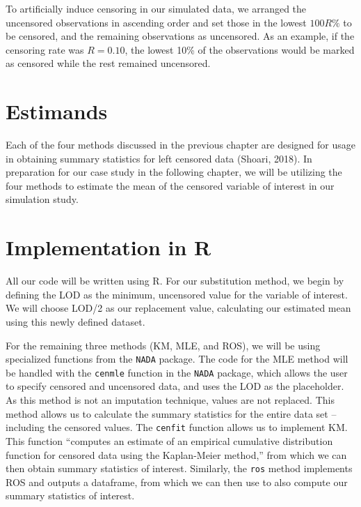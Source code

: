 \documentclass[12pt, twoside]{amherstthesis}
\begin{document}
To artificially induce censoring in our simulated data, we arranged the uncensored observations in ascending order and set those in the lowest \(100R \%\) to be censored, and the remaining observations as uncensored. As an example, if the censoring rate was \(R = 0.10\), the lowest 10\% of the observations would be marked as censored while the rest remained uncensored.

\hypertarget{estimands}{%
\section{Estimands}\label{estimands}}

Each of the four methods discussed in the previous chapter are designed for usage in obtaining summary statistics for left censored data (Shoari, 2018). In preparation for our case study in the following chapter, we will be utilizing the four methods to estimate the mean of the censored variable of interest in our simulation study.

\hypertarget{implementation}{%
\section{Implementation in R}\label{implementation}}

All our code will be written using R. For our substitution method, we begin by defining the LOD as the minimum, uncensored value for the variable of interest. We will choose LOD/2 as our replacement value, calculating our estimated mean using this newly defined dataset.

For the remaining three methods (KM, MLE, and ROS), we will be using specialized functions from the \texttt{NADA} package. The code for the MLE method will be handled with the \texttt{cenmle} function in the \texttt{NADA} package, which allows the user to specify censored and uncensored data, and uses the LOD as the placeholder. As this method is not an imputation technique, values are not replaced. This method allows us to calculate the summary statistics for the entire data set -- including the censored values. The \texttt{cenfit} function allows us to implement KM. This function ``computes an estimate of an empirical cumulative distribution function for censored data using the Kaplan-Meier method,'' from which we can then obtain summary statistics of interest. Similarly, the \texttt{ros} method implements ROS and outputs a dataframe, from which we can then use to also compute our summary statistics of interest.
\end{document}
